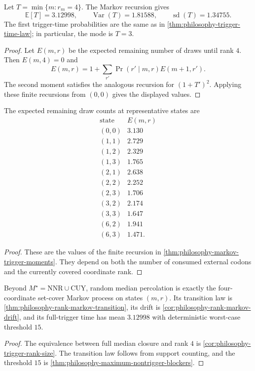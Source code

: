 \begin{theorem}
\label{thm:philosophy-markov-trigger-moments}
Let $T=\min\{m:r_{m}=4\}$. The Markov recursion gives
$$
  \mathbb{E}[T]=3.12998,
  \qquad
  \operatorname{Var}(T)=1.81588,
  \qquad
  \operatorname{sd}(T)=1.34755.
$$
The first trigger-time probabilities are the same as in
\autoref{thm:philosophy-trigger-time-law}; in particular, the mode is
$T=3$.
\end{theorem}
\begin{proof}
Let $E(m,r)$ be the expected remaining number of draws until rank $4$.
Then $E(m,4)=0$ and
$$
  E(m,r)=1+\sum_{r'}\Pr(r'\mid m,r)E(m+1,r').
$$
The second moment satisfies the analogous recursion for
$(1+T')^{2}$. Applying these finite recursions from $(0,0)$ gives the
displayed values.
\end{proof}

\begin{theorem}
\label{thm:philosophy-conditional-remaining-trigger-time}
The expected remaining draw counts at representative states are
$$
\begin{array}{c|r}
  \text{state} & E(m,r)\\
  \hline
  (0,0) & 3.130\\
  (1,1) & 2.729\\
  (1,2) & 2.329\\
  (1,3) & 1.765\\
  (2,1) & 2.638\\
  (2,2) & 2.252\\
  (2,3) & 1.706\\
  (3,2) & 2.174\\
  (3,3) & 1.647\\
  (6,2) & 1.941\\
  (6,3) & 1.471.
\end{array}
$$
\end{theorem}
\begin{proof}
These are the values of the finite recursion in
\autoref{thm:philosophy-markov-trigger-moments}. They depend on both
the number of consumed external codons and the currently covered
coordinate rank.
\end{proof}

\begin{theorem}
\label{thm:philosophy-markov-trigger-theorem}
Beyond $M^{\star}=\mathrm{NNR}\cup\mathrm{CUY}$, random median
percolation is exactly the four-coordinate set-cover Markov process on
states $(m,r)$. Its transition law is
\autoref{thm:philosophy-rank-markov-transition}, its drift is
\autoref{cor:philosophy-rank-markov-drift}, and its full-trigger time
has mean $3.12998$ with deterministic worst-case threshold $15$.
\end{theorem}
\begin{proof}
The equivalence between full median closure and rank $4$ is
\autoref{cor:philosophy-trigger-rank-size}. The transition law follows
from support counting, and the threshold $15$ is
\autoref{thm:philosophy-maximum-nontrigger-blockers}.
\end{proof}

